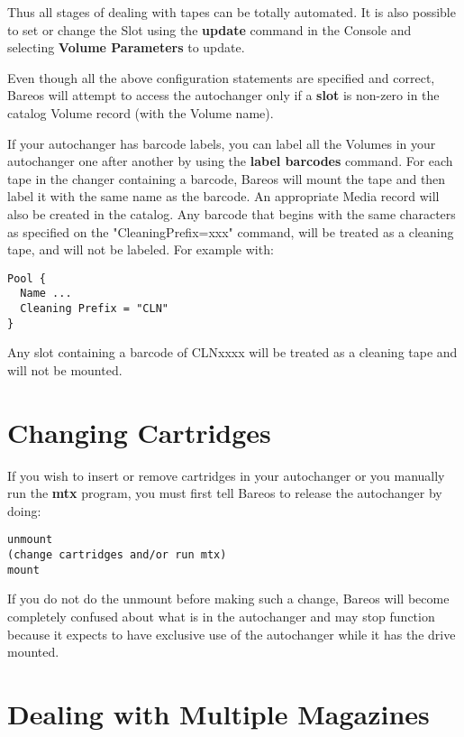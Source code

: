 Thus all stages of dealing with tapes can be totally automated. It is also
possible to set or change the Slot using the {\bf update} command in the
Console and selecting {\bf Volume Parameters} to update.

Even though all the above configuration statements are specified and correct,
Bareos will attempt to access the autochanger only if a {\bf slot} is non-zero
in the catalog Volume record (with the Volume name).

If your autochanger has barcode labels, you can label all the Volumes in
your autochanger one after another by using the {\bf label barcodes} command.
For each tape in the changer containing a barcode, Bareos will mount the tape
and then label it with the same name as the barcode. An appropriate Media
record will also be created in the catalog. Any barcode that begins with the
same characters as specified on the "CleaningPrefix=xxx" command, will be
treated as a cleaning tape, and will not be labeled.
For example with:
\footnotesize
\begin{verbatim}
Pool {
  Name ...
  Cleaning Prefix = "CLN"
}
\end{verbatim}
\normalsize

Any slot containing a barcode of CLNxxxx will be treated as a cleaning tape
and will not be mounted.


\section{Changing Cartridges}
If you wish to insert or remove cartridges in your autochanger or
you manually run the {\bf mtx} program, you must first tell Bareos
to release the autochanger by doing:

\footnotesize
\begin{verbatim}
unmount
(change cartridges and/or run mtx)
mount
\end{verbatim}
\normalsize

If you do not do the unmount before making such a change, Bareos
will become completely confused about what is in the autochanger
and may stop function because it expects to have exclusive use
of the autochanger while it has the drive mounted.


\label{Magazines}
\section{Dealing with Multiple Magazines}

